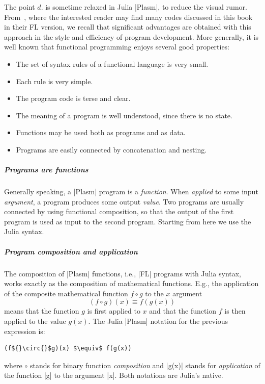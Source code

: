 The point $d.$ is sometime relaxed in Julia |Plasm|, to reduce the visual rumor.
From~\cite{Paoluzzi2003a}, where the interested reader may find many codes discussed in this book in their FL version,  we recall that significant advantages are obtained with this approach in the style and efficiency of program development.
More generally, it is well known that functional programming enjoys several good properties:

\begin{itemize}
\item 
The set of syntax rules of a functional language is very small.
\item 
Each rule is very simple.
\item 
The program code is terse and clear.
\item 
The meaning of a program is well understood, since there is no state. 
\item 
Functions may be used both as programs and as data.
\item 
Programs are easily connected by concatenation and nesting.
\end{itemize}

\subparagraph{Programs are functions}

Generally speaking, a |Plasm| program is a \textit{function}.  When
\emph{applied} to some input \textit{argument}, a program
produces some output \textit{value}.  Two programs are usually
connected by using functional composition, so that the output of the
first program is used as input to the second program. Starting from here we use the Julia syntax.

\subparagraph{Program composition and application}

The composition of |Plasm| functions, i.e., |FL| programs with Julia syntax, works exactly as the composition of mathematical functions.  E.g., the application of the
composite mathematical function $f \circ g$ to the $x$ argument
\[
(f \circ g)(x) \equiv f(g(x))
\]
means that the function $g$ is first applied to $x$ and that the 
function $f$ is then applied to the value $g(x)$.  The Julia |Plasm| notation 
for the previous expression is:
\begin{lstlisting}[language=JuliaLocal, style=julia, mathescape = true]
(f${}\circ{}$g)(x) $\equiv$ f(g(x))
\end{lstlisting}
where $\circ$ stands for binary function \textit{composition} and  
|g(x)| stands for \textit{application} of the function |g| to the 
argument |x|. Both notations are Julia’s native.


